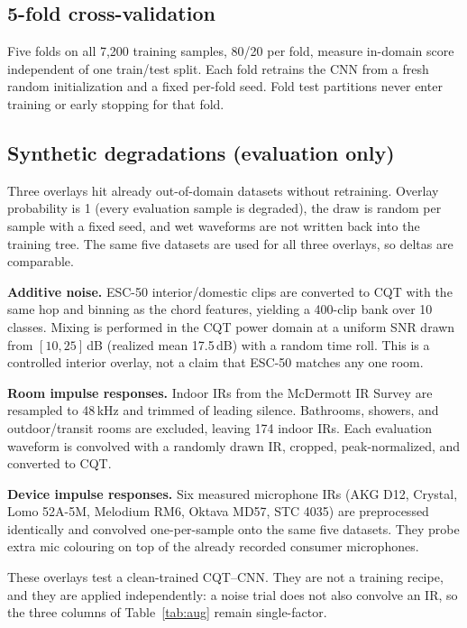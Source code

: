 \documentclass[pdflatex,sn-mathphys-num,iicol]{sn-jnl}
\theoremstyle{thmstyleone}
\theoremstyle{thmstyletwo}
\theoremstyle{thmstylethree}
\begin{document}
\subsection{5-fold cross-validation}\label{subsec3_5}

Five folds on all 7{,}200 training samples, 80/20 per fold, measure in-domain score independent of one train/test split. Each fold retrains the CNN from a fresh random initialization and a fixed per-fold seed. Fold test partitions never enter training or early stopping for that fold.

\subsection{Synthetic degradations (evaluation only)}\label{subsec3_7}

Three overlays hit already out-of-domain datasets without retraining. Overlay probability is 1 (every evaluation sample is degraded), the draw is random per sample with a fixed seed, and wet waveforms are not written back into the training tree. The same five datasets are used for all three overlays, so deltas are comparable.

\textbf{Additive noise.} ESC-50 interior/domestic clips \cite{Piczak2015} are converted to CQT with the same hop and binning as the chord features, yielding a 400-clip bank over 10 classes. Mixing is performed in the CQT power domain at a uniform SNR drawn from $[10, 25]$\,dB (realized mean 17.5\,dB) with a random time roll. This is a controlled interior overlay, not a claim that ESC-50 matches any one room.

\textbf{Room impulse responses.} Indoor IRs from the McDermott IR Survey \cite{Traer2016} are resampled to 48\,kHz and trimmed of leading silence. Bathrooms, showers, and outdoor/transit rooms are excluded, leaving 174 indoor IRs. Each evaluation waveform is convolved with a randomly drawn IR, cropped, peak-normalized, and converted to CQT.

\textbf{Device impulse responses.} Six measured microphone IRs (AKG D12, Crystal, Lomo 52A-5M, Melodium RM6, Oktava MD57, STC 4035) are preprocessed identically and convolved one-per-sample onto the same five datasets. They probe extra mic colouring on top of the already recorded consumer microphones.

These overlays test a clean-trained CQT--CNN. They are not a training recipe, and they are applied independently: a noise trial does not also convolve an IR, so the three columns of Table~\ref{tab:aug} remain single-factor.
\end{document}

